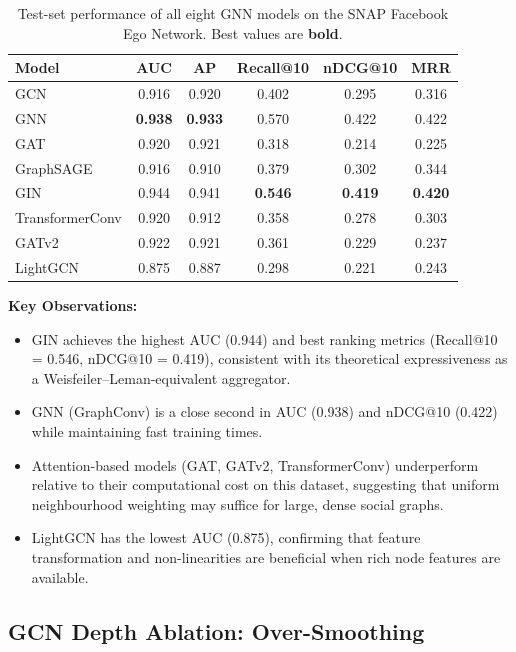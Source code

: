 \documentclass[12pt,a4paper]{article}
\begin{document}
\FloatBarrier

\begin{table}[!htbp]
\centering
\caption{Test-set performance of all eight GNN models on the SNAP Facebook Ego Network. Best values are \textbf{bold}.}
\label{tab:results}
\setlength{\tabcolsep}{5pt}
\begin{tabular}{lccccc}
\toprule
\textbf{Model} & \textbf{AUC} & \textbf{AP} & \textbf{Recall@10} & \textbf{nDCG@10} & \textbf{MRR} \\
\midrule
GCN           & 0.916 & 0.920 & 0.402 & 0.295 & 0.316 \\
GNN           & \textbf{0.938} & \textbf{0.933} & 0.570 & 0.422 & 0.422 \\
GAT           & 0.920 & 0.921 & 0.318 & 0.214 & 0.225 \\
GraphSAGE     & 0.916 & 0.910 & 0.379 & 0.302 & 0.344 \\
GIN           & 0.944 & 0.941 & \textbf{0.546} & \textbf{0.419} & \textbf{0.420} \\
TransformerConv & 0.920 & 0.912 & 0.358 & 0.278 & 0.303 \\
GATv2         & 0.922 & 0.921 & 0.361 & 0.229 & 0.237 \\
LightGCN      & 0.875 & 0.887 & 0.298 & 0.221 & 0.243 \\
\bottomrule
\end{tabular}
\end{table}

\FloatBarrier

\textbf{Key Observations:}
\begin{itemize}
    \item GIN achieves the highest AUC (0.944) and best ranking metrics (Recall@10 = 0.546, nDCG@10 = 0.419), consistent with its theoretical expressiveness as a Weisfeiler--Leman-equivalent aggregator.
    \item GNN (GraphConv) is a close second in AUC (0.938) and nDCG@10 (0.422) while maintaining fast training times.
    \item Attention-based models (GAT, GATv2, TransformerConv) underperform relative to their computational cost on this dataset, suggesting that uniform neighbourhood weighting may suffice for large, dense social graphs.
    \item LightGCN has the lowest AUC (0.875), confirming that feature transformation and non-linearities are beneficial when rich node features are available.
\end{itemize}

\subsection{GCN Depth Ablation: Over-Smoothing}
\end{document}
